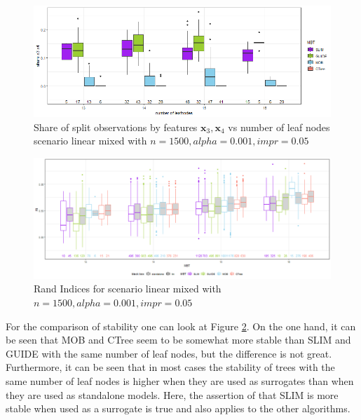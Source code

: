 \begin{figure}[!htb]
\centering
    \includegraphics[width=14cm]{Figures/simulations/chapter_5_simulation_study/basic_scenarios/linear_mixed/lm_1000_standalone_share_x3x4.png}
    \caption{Share of split observations by features $\textbf{x}_3, \textbf{x}_4$ vs number of leaf nodes scenario linear mixed with $n=1500, alpha = 0.001, impr = 0.05$}
    \label{fig:lm_1000_standalone_share_x3x4}

\end{figure} 




\begin{figure}[!htb]
    \includegraphics[width=16cm]{Figures/simulations/chapter_5_simulation_study/basic_scenarios/linear_mixed/lm_1000_standalone_lm_sta.png}
    \caption{Rand Indices for scenario linear mixed with $n=1500, alpha = 0.001, impr = 0.05$}
    \label{fig:lm_1000_standalone_lm_sta}
\end{figure}

For the comparison of stability one can look at Figure \ref{fig:lm_1000_standalone_lm_sta}. On the one hand, it can be seen that MOB and CTree seem to be somewhat more stable than SLIM and GUIDE with the same number of leaf nodes, but the difference is not great. Furthermore, it can be seen that in most cases the stability of trees with the same number of leaf nodes is higher when they are used as surrogates than when they are used as standalone models. Here, the assertion of \citep{Hu.2020} that SLIM is more stable when used as a surrogate is true and also applies to the other algorithms.


